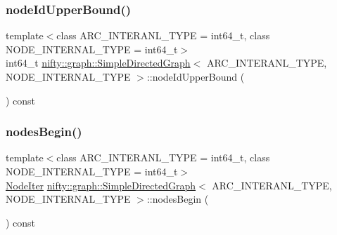 \mbox{\label{classnifty_1_1graph_1_1SimpleDirectedGraph_a7e0b89fa4e9a03314548867a765621f2}} 
\subsubsection{\texorpdfstring{node\+Id\+Upper\+Bound()}{nodeIdUpperBound()}}
{\footnotesize\ttfamily template$<$class A\+R\+C\+\_\+\+I\+N\+T\+E\+R\+A\+N\+L\+\_\+\+T\+Y\+PE  = int64\+\_\+t, class N\+O\+D\+E\+\_\+\+I\+N\+T\+E\+R\+N\+A\+L\+\_\+\+T\+Y\+PE  = int64\+\_\+t$>$ \\
int64\+\_\+t \hyperlink{classnifty_1_1graph_1_1SimpleDirectedGraph}{nifty\+::graph\+::\+Simple\+Directed\+Graph}$<$ A\+R\+C\+\_\+\+I\+N\+T\+E\+R\+A\+N\+L\+\_\+\+T\+Y\+PE, N\+O\+D\+E\+\_\+\+I\+N\+T\+E\+R\+N\+A\+L\+\_\+\+T\+Y\+PE $>$\+::node\+Id\+Upper\+Bound (\begin{DoxyParamCaption}{ }\end{DoxyParamCaption}) const\hspace{0.3cm}{\ttfamily [inline]}}

\mbox{\label{classnifty_1_1graph_1_1SimpleDirectedGraph_aa4cd2db000b40a4f4c2b9713f602c772}} 
\subsubsection{\texorpdfstring{nodes\+Begin()}{nodesBegin()}}
{\footnotesize\ttfamily template$<$class A\+R\+C\+\_\+\+I\+N\+T\+E\+R\+A\+N\+L\+\_\+\+T\+Y\+PE  = int64\+\_\+t, class N\+O\+D\+E\+\_\+\+I\+N\+T\+E\+R\+N\+A\+L\+\_\+\+T\+Y\+PE  = int64\+\_\+t$>$ \\
\hyperlink{classnifty_1_1graph_1_1SimpleDirectedGraph_a50b05474da6846da32398e01be9e3d30}{Node\+Iter} \hyperlink{classnifty_1_1graph_1_1SimpleDirectedGraph}{nifty\+::graph\+::\+Simple\+Directed\+Graph}$<$ A\+R\+C\+\_\+\+I\+N\+T\+E\+R\+A\+N\+L\+\_\+\+T\+Y\+PE, N\+O\+D\+E\+\_\+\+I\+N\+T\+E\+R\+N\+A\+L\+\_\+\+T\+Y\+PE $>$\+::nodes\+Begin (\begin{DoxyParamCaption}{ }\end{DoxyParamCaption}) const\hspace{0.3cm}{\ttfamily [inline]}}

